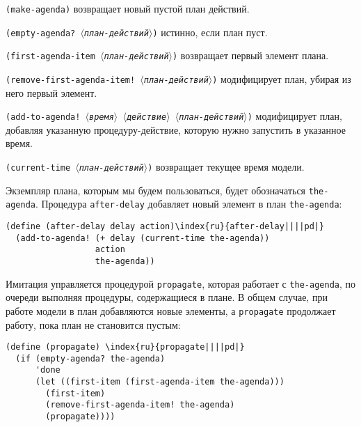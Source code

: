 \begin{plainlist}
\sloppy
\item {\tt (make-agenda)}
возвращает новый пустой план действий.

\item {\tt (empty-agenda? \textit{$\langle$план-действий$\rangle$})}
истинно, если план пуст.

\item {\tt (first-agenda-item \textit{$\langle$план-действий$\rangle$})}%
воз\-вра\-ща\-ет первый элемент плана.

\item {\tt (remove-first-agenda-item! \textit{$\langle$план-действий$\rangle$})}
%
модифицирует план, уби\-рая из него первый элемент.

\item {\tt (add-to-agenda! \textit{$\langle$время$\rangle$} \textit{$\langle$действие$\rangle$} \textit{$\langle$план-действий$\rangle$})}
модифицирует план, добавляя указанную процедуру-действие, которую
нужно запустить в указанное время.

\item {\tt (current-time \textit{$\langle$план-действий$\rangle$})}
возвращает текущее время модели.
\end{plainlist}

Экземпляр плана, которым мы будем пользоваться, будет
обозначаться {\tt the-agenda}.  Процедура
{\tt after-delay} добавляет новый элемент в план
{\tt the-agenda}:

\begin{Verbatim}[fontsize=\small]
(define (after-delay delay action)\index{ru}{after-delay||||pd|}
  (add-to-agenda! (+ delay (current-time the-agenda))
                  action
                  the-agenda))
\end{Verbatim}

Имитация управляется процедурой {\tt propagate},
которая работает с {\tt the-agenda}, по очереди выполняя%
процедуры, содержащиеся в плане.  В общем случае, при работе модели в
план  добавляются новые элементы, а {\tt propagate} продолжает
работу, пока план не становится пустым:

\begin{Verbatim}[fontsize=\small]
(define (propagate) \index{ru}{propagate||||pd|}
  (if (empty-agenda? the-agenda)
      'done
      (let ((first-item (first-agenda-item the-agenda)))
        (first-item)
        (remove-first-agenda-item! the-agenda)
        (propagate))))
\end{Verbatim}

